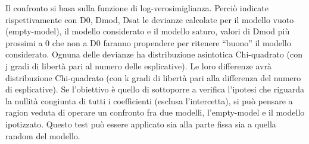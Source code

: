 \documentclass[a4page, 11pt]{article}
\begin{document}
Il confronto si basa sulla funzione di log-verosimiglianza. Perciò indicate rispettivamente con D0, Dmod, Dsat le devianze calcolate per il modello vuoto (empty-model), il modello considerato e il modello saturo, valori di Dmod più prossimi a 0 che non a D0 faranno propendere per ritenere “buono” il modello considerato. Ognuna delle devianze ha distribuzione asintotica Chi-quadrato (con j gradi di libertà pari al numero delle esplicative). Le loro differenze avrà distribuzione Chi-quadrato (con k gradi di libertà pari alla differenza del numero di esplicative).
\newline
Se l’obiettivo è quello di sottoporre a verifica l’ipotesi che riguarda la nullità congiunta di tutti i coefficienti (esclusa l’intercetta), si può pensare a ragion veduta di operare un confronto fra due modelli, l’empty-model e il modello ipotizzato. Questo test può essere applicato sia alla parte fissa sia a quella random del modello.
\end{document}
